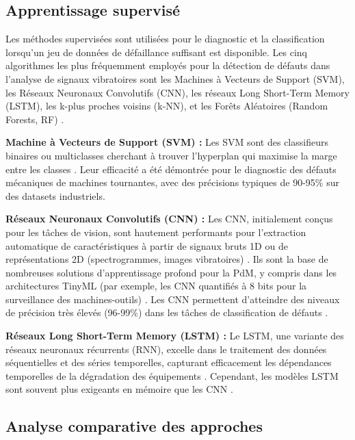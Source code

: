 \subsection{Apprentissage supervisé}

Les méthodes supervisées sont utilisées pour le diagnostic et la classification lorsqu'un jeu de données de défaillance suffisant est disponible. Les cinq algorithmes les plus fréquemment employés pour la détection de défauts dans l'analyse de signaux vibratoires sont les Machines à Vecteurs de Support (SVM), les Réseaux Neuronaux Convolutifs (CNN), les réseaux Long Short-Term Memory (LSTM), les k-plus proches voisins (k-NN), et les Forêts Aléatoires (Random Forests, RF) \cite{bagri2024}.

\textbf{Machine à Vecteurs de Support (SVM) :} Les SVM sont des classifieurs binaires ou multiclasses cherchant à trouver l'hyperplan qui maximise la marge entre les classes \cite{jemmali2021,ran2019}. Leur efficacité a été démontrée pour le diagnostic des défauts mécaniques de machines tournantes, avec des précisions typiques de 90-95\% sur des datasets industriels.

\textbf{Réseaux Neuronaux Convolutifs (CNN) :} Les CNN, initialement conçus pour les tâches de vision, sont hautement performants pour l'extraction automatique de caractéristiques à partir de signaux bruts 1D ou de représentations 2D (spectrogrammes, images vibratoires) \cite{bagri2024}. Ils sont la base de nombreuses solutions d'apprentissage profond pour la PdM, y compris dans les architectures TinyML (par exemple, les CNN quantifiés à 8 bits pour la surveillance des machines-outils) \cite{langer2025}. Les CNN permettent d'atteindre des niveaux de précision très élevés (96-99\%) dans les tâches de classification de défauts \cite{langer2025}.

\textbf{Réseaux Long Short-Term Memory (LSTM) :} Le LSTM, une variante des réseaux neuronaux récurrents (RNN), excelle dans le traitement des données séquentielles et des séries temporelles, capturant efficacement les dépendances temporelles de la dégradation des équipements \cite{ran2019,bagri2024}. Cependant, les modèles LSTM sont souvent plus exigeants en mémoire que les CNN \cite{gupta2025}.

\subsection{Analyse comparative des approches}

